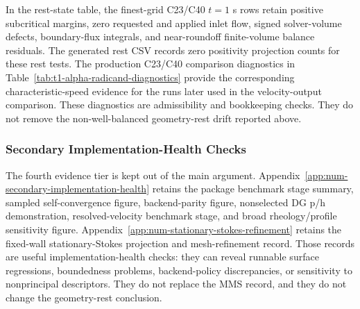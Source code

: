 In the rest-state table, the finest-grid C23/C40 $t=1$ s rows retain
positive subcritical margins, zero requested and applied inlet flow, signed
solver-volume defects, boundary-flux integrals, and near-roundoff finite-volume
balance residuals. The generated rest CSV records zero positivity projection
counts for these rest tests. The production C23/C40 comparison diagnostics in
Table~\ref{tab:t1-alpha-radicand-diagnostics} provide the corresponding
characteristic-speed evidence for the runs later used in the velocity-output
comparison. These diagnostics are admissibility and bookkeeping checks. They do
not remove the non-well-balanced geometry-rest drift reported above.

\subsubsection{Secondary Implementation-Health Checks}
\label{subsec:verification-summary}

The fourth evidence tier is kept out of the main argument. Appendix~\ref{app:num-secondary-implementation-health}
retains the package benchmark stage summary, sampled self-convergence figure,
backend-parity figure, nonselected DG p/h demonstration, resolved-velocity
benchmark stage, and broad rheology/profile sensitivity figure. Appendix~\ref{app:num-stationary-stokes-refinement}
retains the fixed-wall stationary-Stokes projection and mesh-refinement record.
Those records are useful implementation-health checks: they can reveal runnable
surface regressions, boundedness problems, backend-policy discrepancies, or
sensitivity to nonprincipal descriptors. They do not replace the MMS record, and
they do not change the geometry-rest conclusion.

\FloatBarrier
